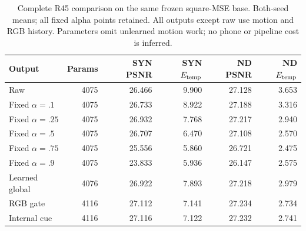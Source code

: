 \begin{table}[t]
\centering\small
\caption{Complete R45 comparison on the same frozen square-MSE base. Both-seed means; all fixed alpha points retained. All outputs except raw use motion and RGB history. Parameters omit unlearned motion work; no phone or pipeline cost is inferred.}
\label{tab:r45}
\begin{tabular}{lrrrrr}
\toprule
Output & Params & SYN PSNR & SYN $E_{\rm temp}$ & ND PSNR & ND $E_{\rm temp}$\\
\midrule
Raw & 4075 & 26.466 & 9.900 & 27.128 & 3.653\\
Fixed $\alpha=.1$ & 4075 & 26.733 & 8.922 & 27.188 & 3.316\\
Fixed $\alpha=.25$ & 4075 & 26.932 & 7.768 & 27.217 & 2.940\\
Fixed $\alpha=.5$ & 4075 & 26.707 & 6.470 & 27.108 & 2.570\\
Fixed $\alpha=.75$ & 4075 & 25.556 & 5.860 & 26.721 & 2.475\\
Fixed $\alpha=.9$ & 4075 & 23.833 & 5.936 & 26.147 & 2.575\\
Learned global & 4076 & 26.922 & 7.893 & 27.218 & 2.979\\
RGB gate & 4116 & 27.112 & 7.141 & 27.234 & 2.734\\
Internal cue & 4116 & 27.116 & 7.122 & 27.232 & 2.741\\
\bottomrule
\end{tabular}
\end{table}
